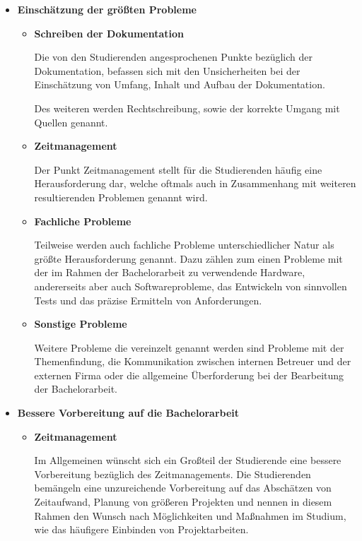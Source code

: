 \documentclass{scrreprt}
\begin{document}
\begin{itemize}
\newpage
\item \textbf{Einschätzung der größten Probleme}

\begin{itemize}
\item \textbf{Schreiben der Dokumentation}
\par Die von den Studierenden angesprochenen Punkte bezüglich der Dokumentation, befassen sich mit den Unsicherheiten bei der Einschätzung von Umfang, Inhalt und Aufbau der Dokumentation. 
\par Des weiteren werden Rechtschreibung, sowie der korrekte Umgang mit Quellen genannt.\\

\item \textbf{Zeitmanagement}
\par Der Punkt Zeitmanagement stellt für die Studierenden häufig eine Herausforderung dar, welche oftmals auch in Zusammenhang mit weiteren resultierenden Problemen genannt wird.\\

\item \textbf{Fachliche Probleme}
\par Teilweise werden auch fachliche Probleme unterschiedlicher Natur als größte Herausforderung genannt. Dazu zählen zum einen Probleme mit der im Rahmen der Bachelorarbeit zu verwendende Hardware, andererseits aber auch Softwareprobleme, das Entwickeln von sinnvollen Tests und das präzise Ermitteln von Anforderungen.\\

\item \textbf{Sonstige Probleme}
\par Weitere Probleme die vereinzelt genannt werden sind Probleme mit der Themenfindung, die Kommunikation zwischen internen Betreuer und der externen Firma oder die allgemeine Überforderung bei der Bearbeitung der Bachelorarbeit.\\
\end{itemize}

\newpage
\item \textbf{Bessere Vorbereitung auf die Bachelorarbeit}
\begin{itemize}

\item \textbf{Zeitmanagement}
\par Im Allgemeinen wünscht sich ein Großteil der Studierende eine bessere Vorbereitung bezüglich des Zeitmanagements. Die Studierenden bemängeln eine unzureichende Vorbereitung auf das Abschätzen von Zeitaufwand, Planung von größeren Projekten und nennen in diesem Rahmen den Wunsch nach Möglichkeiten und Maßnahmen im Studium, wie das häufigere Einbinden von Projektarbeiten.\\


\end{itemize}
\end{itemize}
\end{document}
